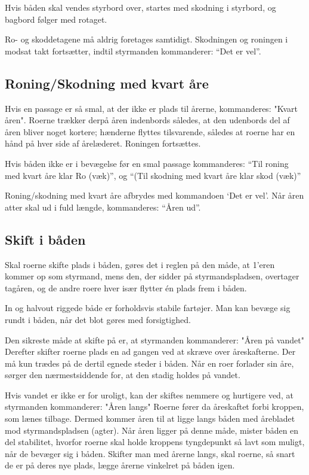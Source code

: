 \documentclass{article}
\begin{document}
Hvis båden skal vendes styrbord over, startes med skodning i styrbord, og
bagbord følger med rotaget.

Ro- og skoddetagene må aldrig foretages samtidigt. Skodningen og roningen
i modsat takt fortsætter, indtil styrmanden kommanderer: ``Det er vel''.

\subsection{Roning/Skodning med kvart åre}

Hvis en passage er så smal, at der ikke er plads til årerne, kommanderes:
"Kvart åren". Roerne trækker derpå åren indenbords således, at den
udenbords del af åren bliver noget kortere; hænderne flyttes tilsvarende,
således at roerne har en hånd på hver side af årelæderet. Roningen
fortsættes.

Hvis båden ikke er i bevægelse før en smal passage kommanderes: ``Til
roning med kvart åre klar Ro (væk)'', og ``(Til skodning med
kvart åre klar skod (væk)''

Roning/skodning med kvart åre afbrydes med kommandoen `Det er vel'. Når
åren atter skal ud i fuld længde, kommanderes: ``Åren ud''.

\subsection{Skift i båden}

Skal roerne skifte plads i båden, gøres det i reglen på den måde, at
1’eren kommer op som styrmand, mens den, der sidder på styrmandspladsen,
overtager tagåren, og de andre roere hver især flytter én plads frem i
båden.

In og halvout riggede både er forholdsvis stabile fartøjer. Man kan
bevæge sig rundt i båden, når det blot gøres med forsigtighed.

Den sikreste måde at skifte på er, at styrmanden kommanderer: "Åren på
vandet" Derefter skifter roerne plads en ad gangen ved at skræve over
åreskafterne. Der må kun trædes på de dertil egnede steder i båden. Når
en roer forlader sin åre, sørger den nærmestsiddende for, at den stadig
holdes på vandet.

Hvis vandet er ikke er for uroligt, kan der skiftes nemmere og hurtigere
ved, at styrmanden kommanderer: "Åren langs" Roerne fører da åreskaftet
forbi kroppen, som lænes tilbage. Dermed kommer åren til at ligge langs
båden med årebladet mod styrmandspladsen (agter). Når åren ligger på
denne måde, mister båden en del stabilitet, hvorfor roerne skal holde
kroppens tyngdepunkt så lavt som muligt, når de bevæger sig i båden.
Skifter man med årerne langs, skal roerne, så snart de er på deres nye
plads, lægge årerne vinkelret på båden igen.
\end{document}
